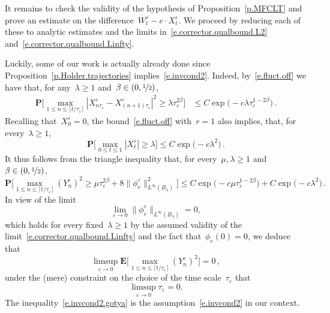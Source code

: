\documentclass[11pt,twoside]{article} %
\numberwithin{equation}{section}
\theoremstyle{definition}
\newcommand{\eps}{\varepsilon}
\newcommand{\ep}{\eps}
\begin{document}
\smallskip

It remains to check the validity of the hypothesis of Proposition~\ref{p.MFCLT} and prove an estimate on the difference~$W^\ep_t - e\cdot X^{\ep}_t$. 
We proceed by reducing each of these to analytic estimates and the limits in~\eqref{e.corrector.qualbound.L2} and~\eqref{e.corrector.qualbound.Linfty}.

\smallskip

Luckily, some of our work is actually already done since Proposition~\ref{p.Holder.trajectories} implies~\eqref{e.invcond2}. Indeed, by~\eqref{e.fluct.off} we have that, for any~$\lambda\geq 1$ and~$\beta \in (0,\nicefrac12)$, 
\begin{align*}
\mathbf{P}
\biggl[ 
\max_{ 1 \leq n \leq \lceil t/\tau_\ep\rceil } 
|X^\ep_{n\tau_\ep} - X^\ep_{(n+1)\tau_\ep } |^2
\geq 
\lambda
\tau_\ep^{2\beta}
\biggr] 
&
\leq
C\exp \bigl( - c\lambda \tau_\ep^{1-2\beta} \bigr) 
\,.
\end{align*}
Recalling that~$X^\ep_0 = 0$, the bound~\eqref{e.fluct.off} with~$r=1$ also implies,  that, for every~$\lambda \geq 1$,
\begin{equation}
\label{e.u.stuck.bro}
\mathbf{P}\biggl[ \max_{ 0 \leq t \leq 1} |X^\ep_{t} | \geq \lambda \biggr]
\leq 
C \exp \bigl(-c\lambda^2\bigr)\,.
\end{equation}
It thus follows from the triangle inequality that, for every~$\mu,\lambda\geq 1$ and~$\beta \in(0,\nicefrac12)$,  
\begin{equation}
\label{e.max.Yepn.bonk}
\mathbf{P} 
\biggl[ 
\max_{ 1 \leq n \leq \lceil t/\tau_\ep\rceil } 
(Y^\ep_n)^2
\geq \mu \tau_\ep^{2\beta} + 8\| \phi^\ep_e\|_{L^\infty(B_\lambda)}^2
\biggr]
\leq 
C \exp \bigl( -c\mu \tau_\ep^{1-2\beta} \bigr) 
+
C \exp \bigl( -c\lambda^2  \bigr)
\,.
\end{equation}
In view of the limit
\begin{equation}
\label{e.phieep.limit.Linfty}
\lim_{\ep \to 0} \| \phi_e^\ep\|_{L^\infty(B_\lambda)}
= 0, 
\end{equation}
which holds for every fixed~$\lambda \geq 1$ by the assumed validity of the limit~\eqref{e.corrector.qualbound.Linfty} and the fact that~$\phi_e(0)=0$, 
we deduce that 
\begin{equation}
\label{e.invcond2.gotya}
\limsup_{\ep \to 0} 
\mathbf{E} 
\biggl[ 
\max_{ 1 \leq n \leq \lceil t/\tau_\ep\rceil } 
(Y^\ep_n)^2
\biggr]
= 0 
\,,
\end{equation}
under the (mere) constraint on the choice of the time scale~$\tau_\ep$ that
\begin{equation}
\label{e.tau.ep.constraint}
\limsup_{\ep \to 0} \tau_\ep = 0. 
\end{equation}
The inequality~\eqref{e.invcond2.gotya} is the assumption~\eqref{e.invcond2} in our context.  
\end{document}
